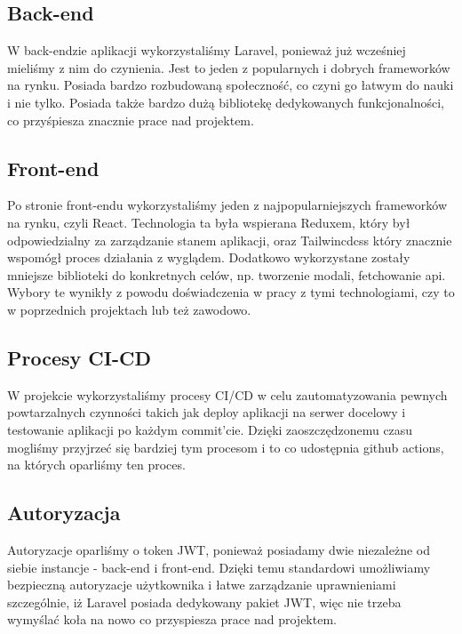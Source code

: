 \documentclass[12pt, letterpaper]{article}
\begin{document}
\subsection{Back-end}
\item{W back-endzie aplikacji wykorzystaliśmy Laravel, ponieważ już wcześniej mieliśmy z nim do czynienia. Jest to jeden z popularnych i dobrych frameworków na rynku. Posiada bardzo rozbudowaną społeczność, co czyni go łatwym do nauki i nie tylko. Posiada także bardzo dużą bibliotekę dedykowanych funkcjonalności, co przyśpiesza znacznie prace nad projektem.}
\subsection{Front-end}
\item{Po stronie front-endu wykorzystaliśmy jeden z najpopularniejszych frameworków na rynku, czyli React. Technologia ta była wspierana Reduxem, który był odpowiedzialny za zarządzanie stanem aplikacji, oraz Tailwincdcss który znacznie wspomógł proces działania z wyglądem. Dodatkowo wykorzystane zostały mniejsze biblioteki do konkretnych celów, np. tworzenie modali, fetchowanie api. Wybory te wynikły z powodu doświadczenia w pracy z tymi technologiami, czy to w poprzednich projektach lub też zawodowo.}
\subsection{Procesy CI-CD}
\item{W projekcie wykorzystaliśmy procesy CI/CD w celu zautomatyzowania pewnych powtarzalnych czynności takich jak deploy aplikacji na serwer docelowy i testowanie aplikacji po każdym commit'cie. Dzięki zaoszczędzonemu czasu mogliśmy przyjrzeć się bardziej tym procesom i to co udostępnia github actions, na których oparliśmy ten proces.
}
\subsection{Autoryzacja}
\item{Autoryzacje oparliśmy o token JWT, ponieważ posiadamy dwie niezależne od siebie instancje - back-end i front-end. Dzięki temu standardowi umożliwiamy bezpieczną autoryzacje użytkownika i łatwe zarządzanie uprawnieniami szczególnie, iż Laravel posiada dedykowany pakiet JWT, więc nie trzeba wymyślać koła na nowo co przyspiesza prace nad projektem.}
\pagebreak
\newpage
\end{document}
